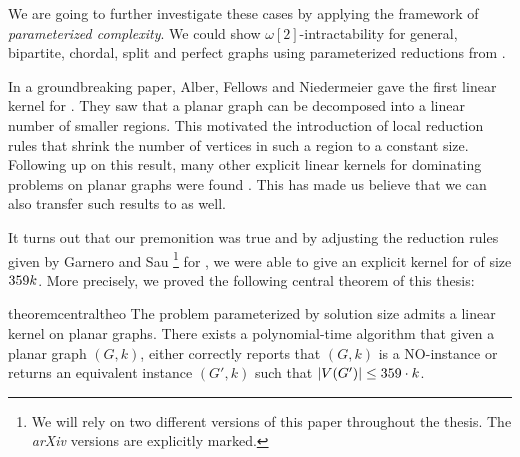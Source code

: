 We are going to further investigate these \NPc cases by applying the framework of \textit{parameterized complexity}. 
We could show $\omega[2]$-intractability for general, bipartite, chordal, split and perfect graphs using parameterized reductions from \dom.

In a groundbreaking paper, Alber, Fellows and Niedermeier \cite{Alber2004} gave the first linear kernel for \pdom. 
They saw that a planar graph can be decomposed into a linear number of smaller regions. 
This motivated the introduction of local reduction rules that shrink the number of vertices in such a region to a constant size. 
Following up on this result, many other explicit linear kernels for dominating problems on planar graphs were found \cite{Guo2007, Garnero2017, Luo2013, Alber2006}. 
This has made us believe that we can also transfer such results to \psdom as well.

It turns out that our premonition was true and by adjusting the reduction rules given by Garnero and Sau \cite{Garnero2018} \footnote{We will rely on two different versions of this paper throughout the thesis. The \textit{arXiv} versions are explicitly marked.} for \ptdom, we were able to give an explicit kernel for \psdom of size $359 k$. 
More precisely, we proved the following central theorem of this thesis:

\begin{restatable}[]{theorem}{centraltheo}\label{thm:central}
    The \sdom problem parameterized by solution size admits a linear kernel on planar graphs. There exists a polynomial-time algorithm that given a planar graph $(G, k)$, either correctly reports that $(G, k)$ is a NO-instance or returns an equivalent instance $(G', k)$ such that $\abs{V(G')} \leq 359 \cdot k$.
\end{restatable}